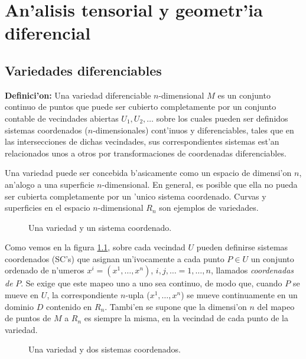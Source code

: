 \chapter{An'alisis tensorial y geometr'ia diferencial}\label{cap:tensores}

\section{Variedades diferenciables}

\textbf{Definici'on:} Una variedad diferenciable $n$-dimensional $M$ es
un conjunto continuo de puntos que puede ser cubierto completamente por un
conjunto contable de vecindades abiertas $U_1, U_2,\dots$ sobre los cuales pueden ser definidos sistemas coordenados ($n$-dimensionales) cont'inuos y diferenciables, tales que en las intersecciones de dichas vecindades, sus correspondientes sistemas est'an relacionados unos a otros por transformaciones de coordenadas diferenciables.

Una variedad puede ser concebida b'asicamente como un espacio de
dimensi'on $n$, an'alogo a una superficie $n$-dimensional. En general,
es posible que ella no pueda ser cubierta completamente por un 'unico sistema coordenado.
Curvas y superficies en el espacio $n$-dimensional $R_n$ son ejemplos de variedades.
\begin{center}
\begin{figure}[H]
\centerline{}
\caption{Una variedad y un sistema coordenado.}
\label{1-1}
\end{figure}
\end{center}

Como vemos en la figura \ref{1-1}, sobre cada vecindad $U$ pueden definirse sistemas coordenados (SC's) que asignan un'ivocamente a cada punto $P\in U$
un conjunto ordenado de n'umeros $x^i=(x^1,\dots ,x^n)$,
$i,j,\dots =1,\dots ,n$, llamados \textit{coordenadas de} $P$. Se exige que este mapeo uno a
uno sea continuo, de modo que, cuando $P$ se mueve en $U$, la correspondiente $n$-upla
($x^1,\dots ,x^n$) se mueve continuamente en un dominio $D$ contenido en $R_n$. Tambi'en se supone que la dimensi'on $n$ del mapeo de puntos de $M$ a $R_n$ es siempre la misma, en la vecindad de cada punto de la variedad.
\begin{center}
\begin{figure}[H]
\centerline{}
\caption{Una variedad y dos sistemas coordenados.}
\label{2-1}
\end{figure}
\end{center}

